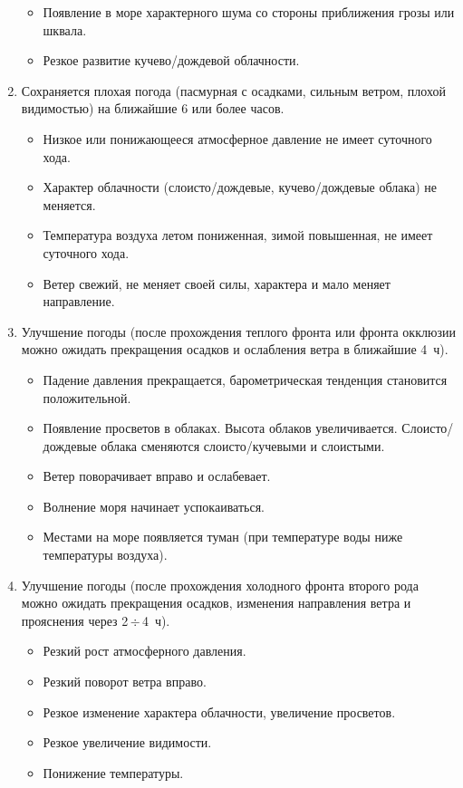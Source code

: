 \documentclass[a4paper, 12pt, twoside, final, book, russian, fittopage, cyremdash]{ncc}
\newcommand{\otdo}{\,\ensuremath{\div}\,}
\begin{document}
\begin{enumerate}
\begin{itemize}
  \item Появление в море характерного шума со стороны приближения грозы или шквала.
  \item Резкое развитие кучево\-/дождевой облачности.
  \end{itemize}
\item Сохраняется плохая погода (пасмурная с осадками, сильным ветром, плохой видимостью) на ближайшие 6 или более часов.
  \begin{itemize}
  \item Низкое или понижающееся атмосферное давление не имеет суточного хода.
  \item Характер облачности (слоисто\-/дождевые, кучево\-/дождевые облака) не меняется.
  \item Температура воздуха летом пониженная, зимой повышенная, не имеет суточного хода.
  \item Ветер свежий, не меняет своей силы, характера и мало меняет направление.
  \end{itemize}
\item Улучшение погоды (после прохождения теплого фронта или фронта окклюзии можно ожидать прекращения осадков и ослабления ветра в ближайшие 4~ч).
  \begin{itemize}
  \item Падение давления прекращается, барометрическая тенденция становится положительной.
  \item Появление просветов в облаках. Высота облаков увеличивается. Слоисто\-/дождевые облака сменяются слоисто\-/кучевыми и слоистыми.
  \item Ветер поворачивает вправо и ослабевает.
  \item Волнение моря начинает успокаиваться.
  \item Местами на море появляется туман (при температуре воды ниже температуры воздуха).
  \end{itemize}
\item Улучшение погоды (после прохождения холодного фронта второго рода можно ожидать прекращения осадков, изменения направления ветра и прояснения через 2\otdo 4~ч).
  \begin{itemize}
  \item Резкий рост атмосферного давления.
  \item Резкий поворот ветра вправо.
  \item Резкое изменение характера облачности, увеличение просветов.
  \item Резкое увеличение видимости.
  \item Понижение температуры.

\end{itemize}
\end{enumerate}
\end{document}
